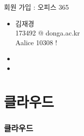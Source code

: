 \documentclass[aspectratio=1610,20pt,xcolor=pdftex,dvipsnames,table,handout]{beamer}
\begin{document}
		\begin{frame} [t,plain]

			\begin{block} {회원 가입 : 오피스 365}
			\setlength{\leftmargini}{2em}			
			\begin{itemize}
				\item 	김재경 \\
						173492 @ donga.ac.kr \hrulefill \\
						Aalice 10308 ! \hrulefill \\
				\item 
				\item 
			\end{itemize}
			\end{block}						

		\end{frame}						

		\begin{frame} [t,plain]
		\end{frame}						





		\section{클라우드 }

		\begin{frame} [t,plain]
		\frametitle{ 클라우드 }
		\end{frame}						
\end{document}
